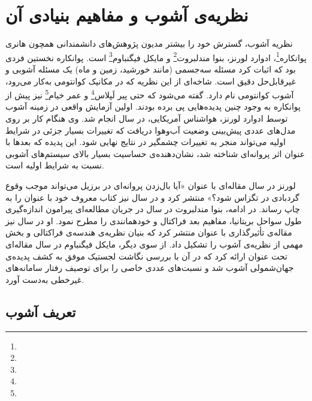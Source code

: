 \section{نظریه‌ی آشوب و مفاهیم بنیادی آن}

نظریه آشوب، گسترش خود را بیشتر مدیون پژوهش‌های دانشمندانی همچون هانری پوانکاره\footnote{}، ادوارد لورنز، بنوا مندلبروت\footnote{} و مایکل فیگنباوم\footnote{} است. پوانکاره نخستین فردی بود که اثبات کرد مسئله سه‌جسمی (مانند خورشید، زمین و ماه) یک مسئله آشوبی و غیرقابل‌حل دقیق است. شاخه‌ای از این نظریه که در مکانیک کوانتومی به‌کار می‌رود، آشوب کوانتومی نام دارد. گفته می‌شود که حتی پیر لَپلاس\footnote{} و عمر خیام\footnote{} نیز پیش از پوانکاره به وجود چنین پدیده‌هایی پی برده بودند. اولین آزمایش واقعی در زمینه آشوب توسط ادوارد لورنز، هواشناس آمریکایی، در سال  انجام شد. وی هنگام کار بر روی مدل‌های عددی پیش‌بینی وضعیت آب‌وهوا دریافت که تغییرات بسیار جزئی در شرایط اولیه می‌تواند منجر به تغییرات چشمگیر در نتایج نهایی شود. این پدیده که بعدها با عنوان اثر پروانه‌ای شناخته شد، نشان‌دهنده‌ی حساسیت بسیار بالای سیستم‌های آشوبی نسبت به شرایط اولیه است\cite{ref46}.

لورنز در سال  مقاله‌ای با عنوان «آیا بال‌زدن پروانه‌ای در برزیل می‌تواند موجب وقوع گردبادی در تگزاس شود؟» منتشر کرد و در سال  نیز کتاب معروف خود با عنوان  را به چاپ رساند. در ادامه، بنوا مندلبروت در سال  در جریان مطالعه‌ای پیرامون اندازه‌گیری طول سواحل بریتانیا، مفاهیم بعد فراکتال و خودهمانندی  را مطرح نمود. او در سال  نیز مقاله‌ی تأثیرگذاری با عنوان  منتشر کرد که بنیان نظریه‌ی هندسه‌ی فراکتالی و بخش مهمی از نظریه‌ی آشوب را تشکیل داد. از سوی دیگر، مایکل فیگنباوم در سال  مقاله‌ای تحت عنوان  ارائه کرد که در آن با بررسی نگاشت لجستیک موفق به کشف پدیده‌ی جهان‌شمولی آشوب شد و نسبت‌های عددی خاصی را برای توصیف رفتار سامانه‌های غیرخطی به‌دست آورد\cite{ref45}.

\subsection{تعریف آشوب}


